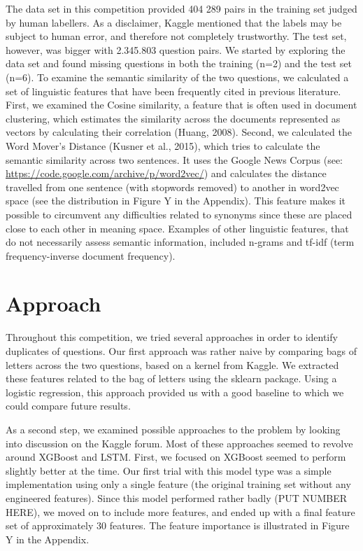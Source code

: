 \documentclass[a4paper]{article}
\begin{document}
The data set in this competition provided 404 289 pairs in the training set judged by human labellers. As a disclaimer, Kaggle mentioned that the labels may be subject to human error, and therefore not completely trustworthy. The test set, however, was bigger with 2.345.803 question pairs. We started by exploring the data set and found missing questions in both the training (n=2) and the test set (n=6). To examine the semantic similarity of the two questions, we calculated a set of linguistic features that have been frequently cited in previous literature. First, we examined the Cosine similarity, a feature that is often used in document clustering, which estimates the similarity across the documents represented as vectors by calculating their correlation (Huang, 2008). Second, we calculated the Word Mover’s Distance (Kusner et al., 2015), which tries to calculate the semantic similarity across two sentences. It uses the Google News Corpus (see: \url{https://code.google.com/archive/p/word2vec/}) and calculates the distance travelled from one sentence (with stopwords removed) to another in word2vec space (see the distribution in Figure Y in the Appendix). This feature makes it possible to circumvent any difficulties related to synonyms since these are placed close to each other in meaning space. Examples of other linguistic features, that do not necessarily assess semantic information, included n-grams and tf-idf (term frequency-inverse document frequency).

\section{Approach}

Throughout this competition, we tried several approaches in order to identify duplicates of questions. Our first approach was rather naive by comparing bags of letters across the two questions, based on a kernel from Kaggle. We extracted these features related to the bag of letters using the sklearn package. Using a logistic regression, this approach provided us with a good baseline to which we could compare future results.
 
As a second step, we examined possible approaches to the problem by looking into discussion on the Kaggle forum. Most of these approaches seemed to revolve around XGBoost and LSTM. First, we focused on XGBoost seemed to perform slightly better at the time. Our first trial with this model type was a simple implementation using only a single feature (the original training set without any engineered features). Since this model performed rather badly (PUT NUMBER HERE), we moved on to include more features, and ended up with a final feature set of approximately 30 features. The feature importance is illustrated in Figure Y in the Appendix.
 
\end{document}
